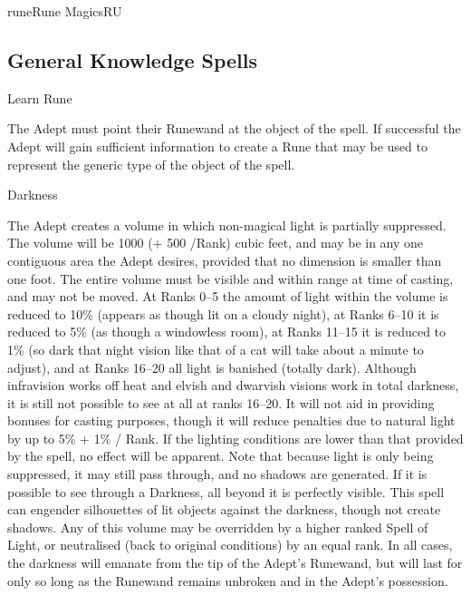 \begin{college}[1.1]{rune}{Rune Magics}{RU}
\subsection{General Knowledge Spells}

\begin{spell}[G-1]{Learn Rune}

\begin{effects}
The Adept must point their Runewand at the object of the spell.  If
successful the Adept will gain sufficient information to create a Rune
that may be used to represent the generic type of the object of the
spell.
\end{effects}
\end{spell}

\begin{spell}[G-2]{Darkness}

\begin{effects}
The Adept creates a volume in which non-magical light is partially
suppressed.  The volume will be 1000 (+ 500 /Rank) cubic feet, and may
be in any one contiguous area the Adept desires, provided that no
dimension is smaller than one foot. The entire volume must be visible
and within range at time of casting, and may not be moved.  At Ranks
0--5 the amount of light within the volume is reduced to 10\% (appears
as though lit on a cloudy night), at Ranks 6--10 it is reduced to 5\%
(as though a windowless room), at Ranks 11--15 it is reduced to 1\%
(so dark that night vision like that of a cat will take about a minute
to adjust), and at Ranks 16--20 all light is banished (\ie totally
dark).  Although infravision works off heat and elvish and dwarvish
visions work in total darkness, it is still not possible to see at all
at ranks 16--20.  It will not aid in providing bonuses for casting
purposes, though it will reduce penalties due to natural light by up
to 5\% + 1\% / Rank.  If the lighting conditions are lower than that
provided by the spell, no effect will be apparent. Note that because
light is only being suppressed, it may still pass through, and no
shadows are generated. If it is possible to see through a Darkness,
all beyond it is perfectly visible. This spell can engender
silhouettes of lit objects against the darkness, though not create
shadows.  Any of this volume may be overridden by a higher ranked
Spell of Light, or neutralised (back to original conditions) by an
equal rank.  In all cases, the darkness will emanate from the tip of
the Adept's Runewand, but will last for only so long as the Runewand
remains unbroken and in the Adept's possession.
\end{effects}
\end{spell}


\end{college}
